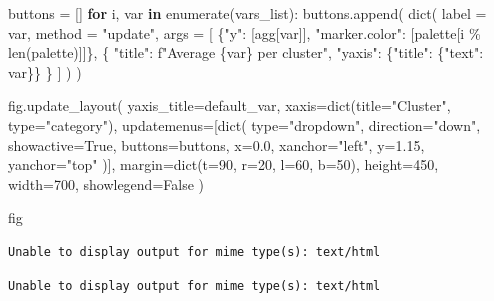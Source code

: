 \documentclass[
  letterpaper,
  DIV=11,
  numbers=noendperiod]{scrreprt}
\newenvironment{Shaded}{\begin{snugshade}}{\end{snugshade}}
\newcommand{\BuiltInTok}[1]{\textcolor[rgb]{0.00,0.23,0.31}{#1}}
\newcommand{\ControlFlowTok}[1]{\textcolor[rgb]{0.00,0.23,0.31}{\textbf{#1}}}
\newcommand{\DecValTok}[1]{\textcolor[rgb]{0.68,0.00,0.00}{#1}}
\newcommand{\FloatTok}[1]{\textcolor[rgb]{0.68,0.00,0.00}{#1}}
\newcommand{\KeywordTok}[1]{\textcolor[rgb]{0.00,0.23,0.31}{\textbf{#1}}}
\newcommand{\NormalTok}[1]{\textcolor[rgb]{0.00,0.23,0.31}{#1}}
\newcommand{\OperatorTok}[1]{\textcolor[rgb]{0.37,0.37,0.37}{#1}}
\newcommand{\SpecialCharTok}[1]{\textcolor[rgb]{0.37,0.37,0.37}{#1}}
\newcommand{\SpecialStringTok}[1]{\textcolor[rgb]{0.13,0.47,0.30}{#1}}
\newcommand{\StringTok}[1]{\textcolor[rgb]{0.13,0.47,0.30}{#1}}
\newcommand{\VariableTok}[1]{\textcolor[rgb]{0.07,0.07,0.07}{#1}}
\begin{document}
\begin{Shaded}
\begin{Highlighting}[]
\NormalTok{buttons }\OperatorTok{=}\NormalTok{ []}
\ControlFlowTok{for}\NormalTok{ i, var }\KeywordTok{in} \BuiltInTok{enumerate}\NormalTok{(vars\_list):}
\NormalTok{    buttons.append(}
        \BuiltInTok{dict}\NormalTok{(}
\NormalTok{            label  }\OperatorTok{=}\NormalTok{ var,}
\NormalTok{            method }\OperatorTok{=} \StringTok{"update"}\NormalTok{,}
\NormalTok{            args   }\OperatorTok{=}\NormalTok{ [}
\NormalTok{                \{}\StringTok{"y"}\NormalTok{: [agg[var]],}
                 \StringTok{"marker.color"}\NormalTok{: [palette[i }\OperatorTok{\%} \BuiltInTok{len}\NormalTok{(palette)]]\},}
\NormalTok{                \{}
                  \StringTok{"title"}\NormalTok{: }\SpecialStringTok{f"Average }\SpecialCharTok{\{}\NormalTok{var}\SpecialCharTok{\}}\SpecialStringTok{ per cluster"}\NormalTok{,}
                  \StringTok{"yaxis"}\NormalTok{: \{}\StringTok{"title"}\NormalTok{: \{}\StringTok{"text"}\NormalTok{: var\}\}}
\NormalTok{                \}}
\NormalTok{            ]}
\NormalTok{        )}
\NormalTok{    )}

\NormalTok{fig.update\_layout(}
\NormalTok{    yaxis\_title}\OperatorTok{=}\NormalTok{default\_var,}
\NormalTok{    xaxis}\OperatorTok{=}\BuiltInTok{dict}\NormalTok{(title}\OperatorTok{=}\StringTok{"Cluster"}\NormalTok{, }\BuiltInTok{type}\OperatorTok{=}\StringTok{"category"}\NormalTok{),}
\NormalTok{    updatemenus}\OperatorTok{=}\NormalTok{[}\BuiltInTok{dict}\NormalTok{(}
        \BuiltInTok{type}\OperatorTok{=}\StringTok{"dropdown"}\NormalTok{,}
\NormalTok{        direction}\OperatorTok{=}\StringTok{"down"}\NormalTok{,}
\NormalTok{        showactive}\OperatorTok{=}\VariableTok{True}\NormalTok{,}
\NormalTok{        buttons}\OperatorTok{=}\NormalTok{buttons,}
\NormalTok{        x}\OperatorTok{=}\FloatTok{0.0}\NormalTok{, xanchor}\OperatorTok{=}\StringTok{"left"}\NormalTok{,}
\NormalTok{        y}\OperatorTok{=}\FloatTok{1.15}\NormalTok{, yanchor}\OperatorTok{=}\StringTok{"top"}
\NormalTok{    )],}
\NormalTok{    margin}\OperatorTok{=}\BuiltInTok{dict}\NormalTok{(t}\OperatorTok{=}\DecValTok{90}\NormalTok{, r}\OperatorTok{=}\DecValTok{20}\NormalTok{, l}\OperatorTok{=}\DecValTok{60}\NormalTok{, b}\OperatorTok{=}\DecValTok{50}\NormalTok{),}
\NormalTok{    height}\OperatorTok{=}\DecValTok{450}\NormalTok{, width}\OperatorTok{=}\DecValTok{700}\NormalTok{,}
\NormalTok{    showlegend}\OperatorTok{=}\VariableTok{False}
\NormalTok{)}

\NormalTok{fig}
\end{Highlighting}
\end{Shaded}

\begin{verbatim}
Unable to display output for mime type(s): text/html
\end{verbatim}

\begin{verbatim}
Unable to display output for mime type(s): text/html
\end{verbatim}
\end{document}
